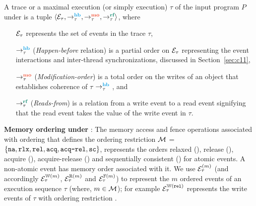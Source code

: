 \begin{definition}[Trace]\newline
{}
	A trace or a maximal execution (or simply execution) $\tau$ of the input 
	program $P$ under \cc is a tuple 
	$\langle \events_\tau, \setHB, \setMO, \setRF \rangle$, where
	\begin{itemize}[label=sethb,align=left,leftmargin=*]
		\item [$\mathcal{E}_\tau$] represents the set of events in the trace $\tau$,
		\item [$\setHB$] ({\em Happen-before} relation) is a partial order on
			$\mathcal{E}_\tau$ representing the event interactions and inter-thread
			synchronizations, discussed in Section~\ref{sec:c11},
		\item [$\setMO$] ({\em Modification-order}) is a total order on the
			writes of an object that establishes coherence of $\tau$ 
			\wrt $\setHB$ , and
		\item [$\setRF$] ({\em Reads-from}) is a relation from a write event to
			a read event signifying that the read event takes the value of 
			the write event in $\tau$.
	\end{itemize}
\end{definition}

\noindent
{\bf Memory ordering under \cc}: 
 The memory access and fence operations
   
associated with  ordering 
that defines the ordering restriction 
%
%
 $\mathcal{M}$ = $\{ \texttt{na}, \texttt{rlx}, \texttt{rel}, \texttt{acq}, \texttt{acq-rel}, \texttt{sc} \}$, 
represents the orders relaxed (\rlx), release (\rel), acquire (\acq),
acquire-release (\acqrel) and sequentially consistent (\sc) for
atomic events. A non-atomic event has \na memory order associated with 
it.
%
We use $\mathcal{E}^{(m)}_\tau$ (and accordingly $\mathcal{E}^{\mathbb{W}(m)}_\tau$, 
$\mathcal{E}^{\mathbb{R}(m)}_\tau$ and $\mathcal{E}^{\mathbb{F}(m)}_\tau$) to represent the $m$
ordered events of an execution sequence $\tau$ (where, $m \in \mathcal{M}$);
for example $\mathcal{E}^{\mathbb{W}(\texttt{rel})}_\tau$ represents the write events of 
$\tau$ with ordering restriction \rel. 

